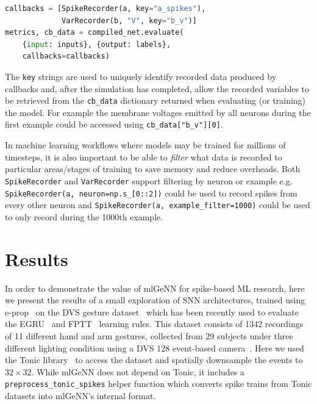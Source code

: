 \documentclass[sigconf]{acmart}
\begin{document}
\begin{lstlisting}[language=Python]
callbacks = [SpikeRecorder(a, key="a_spikes"),
             VarRecorder(b, "V", key="b_v")]
metrics, cb_data = compiled_net.evaluate(
    {input: inputs}, {output: labels},
    callbacks=callbacks)
\end{lstlisting}

The \lstinline{key} strings are used to uniquely identify recorded data produced by callbacks and, after the simulation has completed, allow the recorded variables to be retrieved from the \lstinline{cb_data} dictionary returned when evaluating (or training) the model.
For example the membrane voltages emitted by all neurons during the first example could be accessed using \lstinline{cb_data["b_v"][0]}.

In machine learning workflows where models may be trained for millions of timesteps, it is also important to be able to \emph{filter} what data is recorded to particular areas/stages of training to save memory and reduce overheads.
Both \lstinline{SpikeRecorder} and \lstinline{VarRecorder} support filtering by neuron or example e.g. \\ \lstinline{SpikeRecorder(a, neuron=np.s_[0::2])} could be used to record spikes from every other neuron and \lstinline{SpikeRecorder(a, example_filter=1000)} could be used to only record during the 1000th example.


\section{Results}
In order to demonstrate the value of mlGeNN for spike-based ML research, here we present the results of a small exploration of SNN architectures, trained using e-prop~\citep{Bellec2020} on the DVS gesture dataset~\citep{amir_low_2017} which has been recently used to evaluate the EGRU~\citep{subramoney2022egru} and FPTT~\citep{yin2021accurate} learning rules.
This dataset consists of \num{1342} recordings of \num{11} different hand and arm gestures, collected from \num{29} subjects under three different lighting condition using a DVS 128 event-based camera~\citep{lichtsteiner_128times128_2008}.
Here we used the Tonic library~\citep{lenz_gregor_2021_5079802} to access the dataset and spatially downsample the events to $32\times32$.
While mlGeNN does not depend on Tonic, it includes a \lstinline{preprocess_tonic_spikes} helper function which converts spike trains from Tonic datasets into mlGeNN's internal format.
\end{document}
